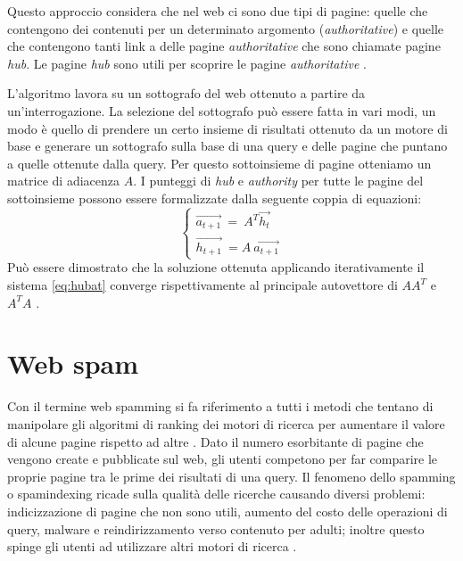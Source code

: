 Questo approccio considera che nel web ci sono due tipi di pagine: quelle che contengono dei contenuti per un determinato argomento (\textit{authoritative}) e quelle che contengono tanti link a delle pagine \textit{authoritative} che sono chiamate pagine \textit{hub}. Le pagine \textit{hub} sono utili per scoprire le pagine \textit{authoritative} \cite{Manning:2008:IIR:1394399p474}.

L'algoritmo lavora su un sottografo del web ottenuto a partire da un'interrogazione. La selezione del sottografo può essere fatta in vari modi, un modo è quello di prendere un certo insieme di risultati  ottenuto da un motore di base e generare un sottografo sulla base di una query e delle pagine che puntano a quelle ottenute dalla query. Per questo sottoinsieme di pagine otteniamo un matrice di adiacenza \(A\). I punteggi di \textit{hub} e \textit{authority} per tutte le pagine del sottoinsieme possono essere formalizzate dalla seguente coppia di equazioni:
\begin{equation}
 \left\{
 \begin{array}{cc}
    \stackrel{\rightarrow}{a_{t+1}} \: = \: A^T \stackrel{\rightarrow}{h_t}\\
    \stackrel{\rightarrow}{h_{t+1}} \:= A \: \stackrel{\rightarrow}{a_{t+1}}
 \end{array}
 \right .
 \label{eq:hubat}
\end{equation}
Può essere dimostrato che la soluzione ottenuta applicando iterativamente il sistema \ref{eq:hubat} converge rispettivamente al principale autovettore di \(AA^T\) e \(A^TA\) \cite{Manning:2008:IIR:1394399p474}\cite{Spirin:2012:SWS:2207243.2207252}.
\section{Web spam}
Con il termine web spamming si fa riferimento a tutti i metodi che tentano di manipolare gli algoritmi di ranking dei motori di ricerca per aumentare il valore di alcune pagine rispetto ad altre \cite{ilprints646}.
Dato il numero esorbitante di pagine che vengono create e pubblicate sul web, gli utenti competono per far comparire le proprie pagine tra le prime dei risultati di una query.
Il fenomeno dello spamming o spamindexing ricade sulla qualità delle ricerche causando diversi problemi: indicizzazione di pagine che non sono utili, aumento del costo delle operazioni di query, malware e reindirizzamento verso contenuto per adulti; inoltre questo spinge gli utenti ad utilizzare altri motori di ricerca \cite{Spirin:2012:SWS:2207243.2207252}.

